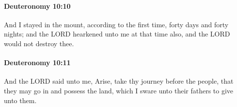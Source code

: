 		\paragraph{Deuteronomy 10:10} %
			\label{DEUTERONOMY-10-10}

			And I stayed in the mount, according to the first time, forty days and forty nights; and the LORD hearkened unto me at that time also, and the LORD would not destroy thee.


		\paragraph{Deuteronomy 10:11} %
			\label{DEUTERONOMY-10-11}

			And the LORD said unto me, Arise, take thy journey before the people, that they may go in and possess the land, which I sware unto their fathers to give unto them.


